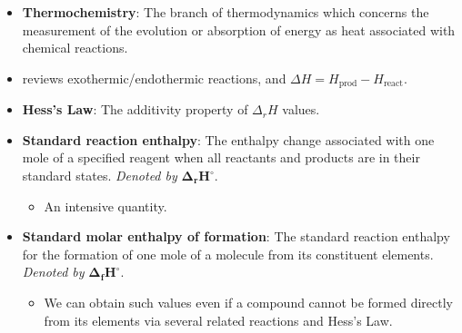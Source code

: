 \documentclass[../notes.tex]{subfiles}
\begin{document}
\begin{itemize}
\begin{itemize}
    \end{itemize}
    \item \textbf{Thermochemistry}: The branch of thermodynamics which concerns the measurement of the evolution or absorption of energy as heat associated with chemical reactions.
    \item \textcite{bib:McQuarrieSimon} reviews exothermic/endothermic reactions, and $\Delta H=H_\text{prod}-H_\text{react}$.
    \item \textbf{Hess's Law}: The additivity property of $\Delta_rH$ values.
    \item \textbf{Standard reaction enthalpy}: The enthalpy change associated with one mole of a specified reagent when all reactants and products are in their standard states. \emph{Denoted by} $\bm{\Delta_rH^\circ}$.
    \begin{itemize}
        \item An intensive quantity.
    \end{itemize}
    \item \textbf{Standard molar enthalpy of formation}: The standard reaction enthalpy for the formation of one mole of a molecule from its constituent elements. \emph{Denoted by} $\bm{\Delta_fH^\circ}$.
    \begin{itemize}
        \item We can obtain such values even if a compound cannot be formed directly from its elements via several related reactions and Hess's Law.
    \end{itemize}
\end{itemize}
\end{document}
